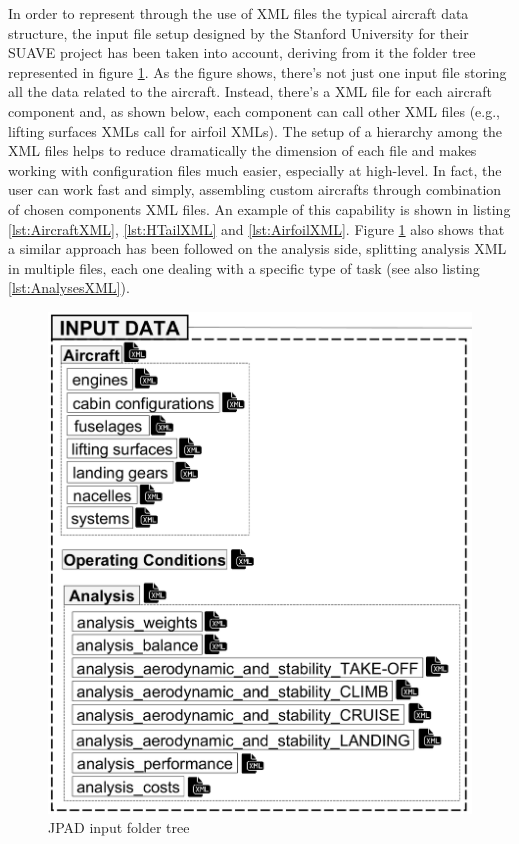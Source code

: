 \bigskip
\noindent
In order to represent through the use of XML files the typical aircraft data structure, the input file setup designed by the Stanford University for their SUAVE project \cite{SUAVEProject} has been taken into account, deriving from it the folder tree represented in figure \ref{fig:JPADinputfoldertree}. As the figure shows, there's not just one input file storing all the data related to the aircraft. Instead, there's a XML file for each aircraft component and, as shown below, each component can call other XML files (e.g., lifting surfaces XMLs call for airfoil XMLs). The setup of a hierarchy among the XML files helps to reduce dramatically the dimension of each file and makes working with configuration files much easier, especially at high-level. In fact, the user can work fast and simply, assembling custom aircrafts through combination of chosen components XML files. An example of this capability is shown in listing \ref{lst:AircraftXML}, \ref{lst:HTailXML} and \ref{lst:AirfoilXML}. Figure \ref{fig:JPADinputfoldertree} also shows that a similar approach has been followed on the analysis side, splitting analysis XML in multiple files, each one dealing with a specific type of task (see also listing \ref{lst:AnalysesXML}).
%
\begin{figure}[H]
\centering
\includegraphics[scale=0.85]{Immagini/Capitolo1/JPADInputData}
\caption{JPAD input folder tree}
\label{fig:JPADinputfoldertree}
\end{figure}
%

